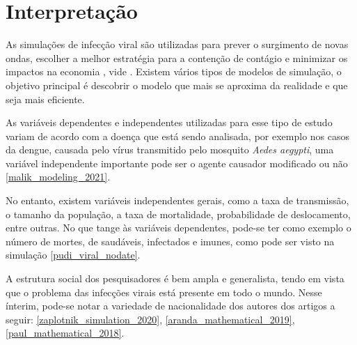 \section{Interpretação}

As simulações de infecção viral são utilizadas para prever o surgimento de novas ondas, escolher a melhor estratégia para a contenção de contágio e minimizar os impactos na economia , vide \cite{maheshwari_network_2020-1}.  Existem vários tipos de modelos de simulação, o objetivo principal é descobrir o modelo que mais se aproxima da realidade e que seja mais eficiente.

As variáveis dependentes e independentes utilizadas para esse tipo de estudo variam de acordo com a doença que está sendo analisada, por exemplo nos casos da dengue, causada pelo vírus transmitido pelo mosquito \textit{Aedes aegypti}, uma variável independente importante pode ser o agente causador modificado ou não \ref{malik_modeling_2021}. 

No entanto, existem variáveis independentes gerais, como a taxa de transmissão, o tamanho da população, a taxa de mortalidade, probabilidade de deslocamento, entre outras. No que tange às variáveis dependentes, pode-se ter como exemplo o número de mortes, de saudáveis, infectados e imunes, como pode ser visto na simulação \ref{pudi_viral_nodate}.

A estrutura social dos pesquisadores é bem ampla e generalista, tendo em vista que o problema das infecções virais está presente em todo o mundo. Nesse ínterim, pode-se notar a variedade de nacionalidade dos autores dos artigos a seguir: \ref{zaplotnik_simulation_2020}, \ref{aranda_mathematical_2019},\ref{paul_mathematical_2018}.